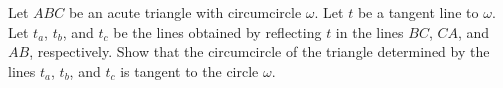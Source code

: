 Let $ABC$ be an acute triangle with circumcircle $\omega$. Let $t$ be a tangent line to $\omega$. Let $t_a$, $t_b$, and $t_c$ be the lines obtained by reflecting $t$ in the lines $BC$, $CA$, and $AB$, respectively. Show that the circumcircle of the triangle determined by the lines $t_a$, $t_b$, and $t_c$ is tangent to the circle $\omega$.
